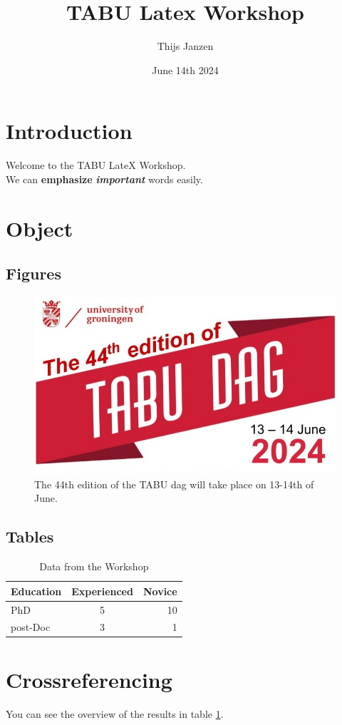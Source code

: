 \documentclass{article}
\title{TABU Latex Workshop}
\author{Thijs Janzen}
\date{June 14th 2024}
\begin{document}

\section{Introduction}

Welcome to the TABU LateX Workshop. \\
We can \textbf{emphasize} \textit{\textbf{important}} words easily.


\section{Object}
\subsection*{Figures}

\begin{figure}[h]
    \centering
    \includegraphics{TABU.jpeg}
    \caption{The 44th edition of the TABU dag will take place on 13-14th of June.}
    \label{fig:tabu_dag_figure}
\end{figure}

\subsection*{Tables}

\begin{table}[]
    \centering
    \begin{tabular}{|l|c|r|}
    \hline
    Education & Experienced & Novice \\
    \hline \hline
        PhD & 5 & 10 \\
    \hline
        post-Doc & 3 & 1 \\
    \hline

    \end{tabular}
    \caption{Data from the Workshop}
    \label{tab:my_table}
\end{table}

\section{Crossreferencing}

You can see the overview of the results in table \ref{tab:my_table}.
\end{document}
